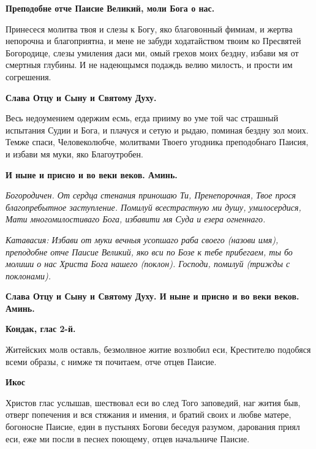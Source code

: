 \bfseries Преподобне отче Паисие Великий, моли Бога о нас.\normalfont{} 




Принесеся молитва твоя и слезы к Богу, яко благовонный фимиам, и жертва непорочна и благоприятна, и мене не забуди ходатайством твоим ко Пресвятей Богородице, слезы умиления даси ми, омый грехов моих бездну, избави мя от смертныя глубины. И не надеющымся подаждь велию милость, и прости им согрешения. 




\bfseries Слава Отцу и Сыну и Святому Духу.\normalfont{} 




Весь недоумением одержим есмь, егда прииму во уме той час страшный испытания Судии и Бога, и плачуся и сетую и рыдаю, поминая бездну зол моих. Темже спаси, Человеколюбче, молитвами Твоего угодника преподобнаго Паисия, и избави мя муки, яко Благоутробен. 




\bfseries И ныне и присно и во веки веков. Аминь.\normalfont{}\nopagebreak




\itshape  Богородичен.\normalfont{} От сердца стенания приношаю Ти, Пренепорочная, Твое прося благопребытное заступление. Помилуй всестрастную ми душу, умилосердися, Мати многомилостиваго Бога, избавити мя Суда и езера огненнаго. 




\itshape Катавасия:\normalfont{} Избави от муки вечныя усопшаго раба своего (\itshape назови имя\normalfont{}), преподобне отче Паисие Великий, яко вси по Бозе к тебе прибегаем, ты бо молиши о нас Христа Бога нашего (\itshape поклон\normalfont{}). Господи, помилуй (\itshape трижды с поклонами\normalfont{}). 




\bfseries Слава Отцу и Сыну и Святому Духу. И ныне и присно и во веки веков. Аминь.\normalfont{} 




\bfseries Кондак, глас 2-й.\normalfont{} 




Житейских молв оставль, безмолвное житие возлюбил еси, Крестителю подобяся всеми образы, с нимже тя почитаем, отче отцев Паисие. 




\bfseries Икос\normalfont{}\nopagebreak

Христов глас услышав, шествовал еси во след Того заповедий, наг жития быв, отверг попечения и вся стяжания и имения, и братий своих и любве матере, богоносне Паисие, един в пустынях Богови беседуя разумом, дарования приял еси, еже ми посли в песнех поющему, отцев начальниче Паисие. 





